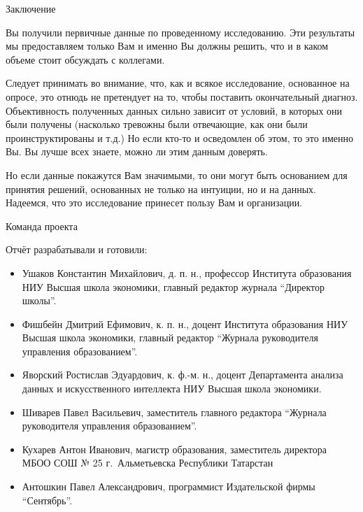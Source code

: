 \begin{frame}{Заключение}

\tiny 
Вы получили первичные данные по проведенному исследованию. Эти результаты мы предоставляем только Вам и именно Вы должны решить, что и в каком объеме стоит обсуждать с коллегами. 
\smallskip

Следует принимать во внимание, что, как и всякое исследование, основанное на опросе, это отнюдь не претендует на то, чтобы поставить окончательный диагноз. Объективность полученных данных сильно зависит от условий, в которых они были получены (насколько тревожны были отвечающие, как они были проинструктированы и т.д.) Но если кто-то и осведомлен об этом, то это именно Вы.  Вы лучше всех знаете, можно ли этим данным доверять.
\smallskip

Но  если данные покажутся Вам значимыми, то они могут быть основанием для принятия решений, основанных не только на интуиции, но и на данных. Надеемся, что это исследование принесет пользу Вам и организации.


\end{frame}

\begin{frame}{Команда проекта}

\tiny 
Отчёт разрабатывали и готовили:

\begin{itemize}

\item Ушаков Константин Михайлович, д. п. н., профессор Института образования НИУ Высшая школа экономики, главный редактор журнала ``Директор школы''.

\item Фишбейн Дмитрий Ефимович, к. п. н., доцент Института образования НИУ Высшая школа экономики, главный редактор ``Журнала руководителя управления образованием''.

\item Яворский Ростислав Эдуардович, к. ф.-м. н., доцент Департамента анализа данных и искусственного интеллекта НИУ Высшая школа экономики.

\item Шиварев Павел Васильевич, заместитель главного редактора ``Журнала руководителя управления образованием''.

\item Кухарев Антон Иванович, магистр образования, заместитель директора МБОО СОШ № 25 г.~Альметьевска Республики Татарстан

\item Антошкин Павел Александрович, программист Издательской фирмы ``Сентябрь''.

\end{itemize}

\end{frame}


